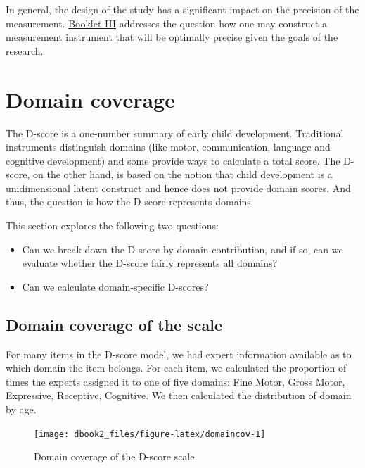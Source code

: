 \documentclass[
]{book}
\providecommand{\tightlist}{%
  \setlength{\itemsep}{0pt}\setlength{\parskip}{0pt}}
\begin{document}
In general, the design of the study has a significant impact on the precision of the measurement. \href{https://stefvanbuuren.name/dbook3/}{Booklet III} addresses the question how one may construct a measurement instrument that will be optimally precise given the goals of the research.

\hypertarget{sec:domains}{%
\section{Domain coverage}\label{sec:domains}}

The D-score is a one-number summary of early child development. Traditional instruments distinguish domains (like motor, communication, language and cognitive development) and some provide ways to calculate a total score. The D-score, on the other hand, is based on the notion that child development is a unidimensional latent construct and hence does not provide domain scores. And thus, the question is how the D-score represents domains.

This section explores the following two questions:

\begin{itemize}
\tightlist
\item
  Can we break down the D-score by domain contribution, and if so, can we evaluate whether the D-score fairly represents all domains?
\item
  Can we calculate domain-specific D-scores?
\end{itemize}

\hypertarget{domain-coverage-of-the-scale}{%
\subsection{Domain coverage of the scale}\label{domain-coverage-of-the-scale}}

For many items in the D-score model, we had expert information available as to which domain the item belongs. For each item, we calculated the proportion of times the experts assigned it to one of five domains: Fine Motor, Gross Motor, Expressive, Receptive, Cognitive. We then calculated the distribution of domain by age.

\begin{figure}

{\centering \texttt{[image: dbook2\_files/figure-latex/domaincov-1]} 

}

\caption{Domain coverage of the D-score scale.}\label{fig:domaincov}
\end{figure}
\end{document}
